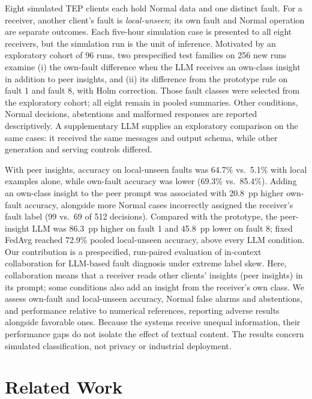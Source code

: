 \documentclass[conference]{IEEEtran}
\newcommand{\TEP}{TEP}
\begin{document}
Eight simulated \TEP{} clients each hold Normal data and one distinct fault. For a receiver, another client's fault is \emph{local-unseen}; its own fault and Normal operation are separate outcomes. Each five-hour simulation case is presented to all eight receivers, but the simulation run is the unit of inference. Motivated by an exploratory cohort of 96 runs, two prespecified test families on 256 new runs examine (i) the own-fault difference when the LLM receives an own-class insight in addition to peer insights, and (ii) its difference from the prototype rule on fault 1 and fault 8, with Holm correction. Those fault classes were selected from the exploratory cohort; all eight remain in pooled summaries. Other conditions, Normal decisions, abstentions and malformed responses are reported descriptively. A supplementary LLM supplies an exploratory comparison on the same cases: it received the same messages and output schema, while other generation and serving controls differed.

With peer insights, accuracy on local-unseen faults was 64.7\% vs.\ 5.1\% with local examples alone, while own-fault accuracy was lower (69.3\% vs.\ 85.4\%). Adding an own-class insight to the peer prompt was associated with 20.8~pp higher own-fault accuracy, alongside more Normal cases incorrectly assigned the receiver's fault label (99 vs.\ 69 of 512 decisions). Compared with the prototype, the peer-insight LLM was 86.3~pp higher on fault 1 and 45.8~pp lower on fault 8; fixed FedAvg reached 72.9\% pooled local-unseen accuracy, above every LLM condition. Our contribution is a prespecified, run-paired evaluation of in-context
collaboration for LLM-based fault diagnosis under extreme label skew.
Here, collaboration means that a receiver reads other clients' insights (peer insights) in its prompt; some conditions also add an insight from the receiver's own class.
We assess own-fault and local-unseen accuracy, Normal false alarms and
abstentions, and performance relative to numerical references, reporting
adverse results alongside favorable ones.
Because the systems receive unequal information, their performance gaps
do not isolate the effect of textual content.
The results concern simulated classification, not privacy or industrial
deployment.

\section{Related Work}
\label{sec:related}
\end{document}
